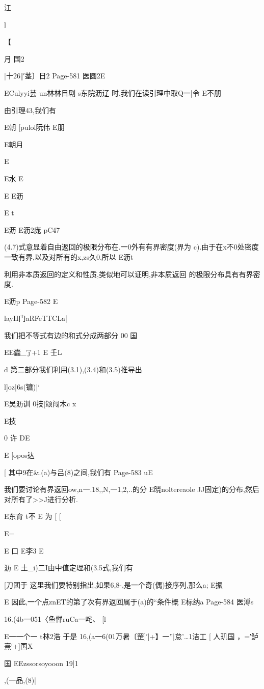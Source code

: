 {江

l

【

月
国2

|十26‖′茎〕日2
Page-581
医圆2E

ECulyyi芸
un林林目剧
s东院沥辽
时,我们在读引理中取Q一|令
E不朋

由引理43,我们有

E朝
[pulol阮伟
E朋

E朝月

E

E水
E

E
E沥

E
t

E沥
E沥2庞
pC47

(4.7)式意显着自由返回的极限分布在.一0外有有界密度(界为
c).由于在x不0处密度一致有界,以及对所有的x,zs久0,所以
E沥t

利用非本质返回的定义和性质,类似地可以证明,非本质返回
的极限分布具有有界密度.

E沥p
Page-582
E

layH门aRFeTTCLa|

我们把不等式有边的和式分成两部分
00
国

EE蠹_′j′+1
E
壬L

d
第二部分我们利用(3.1),(3.4)和(3.5)推导出

l]oz|6s(镳)|`

E吴沥训
0技[颂闯木c
x

E技

0
许
DE

E
[opos达

[
其中9在&.(a)与吕(8)之间,我们有
Page-583
uE

我们要讨论有界返回{ow},n一.18,,N,一1,2,..的分
E晓noltereaole
JJ固定)的分布,然后对所有了>>J进行分析.

E东育
t不
E
为
[
[

E={

E
口
E李3
E

沥
E
土_i)二I由中值定理和(3.5式,我们有

[刀团于
这里我们要特别指出,如果{6,}8-,是一个奇(偶)接序列,那么a;
E振

E
因此,一个点znET的第了次有界返回属于(a)的“条件概
E标纳a
Page-584
医溥s

16.(4b一051〈鱼惮ruCa一咤、
[l

E一一个一
t林2浩
于是
16,(a一6(01万暑〔罡]′]+】一”|怠'…1洁工
[
人玑国
，=′鲈熹′+]国X

国
EEzssorsoyooon
19]1

,(一品,(8)|

}}
